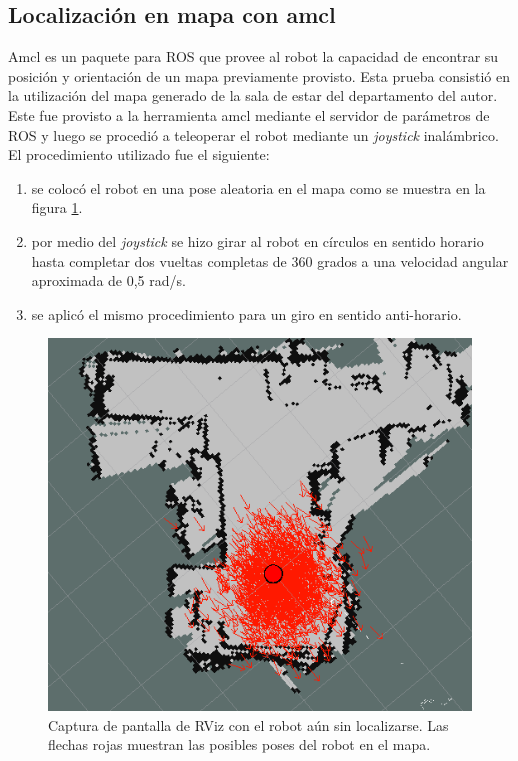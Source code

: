 \subsection{Localización en mapa con amcl}

Amcl es un paquete para ROS que provee al robot la capacidad de encontrar su posición y orientación de un mapa previamente provisto. Esta prueba consistió en la utilización del mapa generado de la sala de estar del departamento del autor. Este fue provisto a la herramienta amcl mediante el servidor de parámetros de ROS y luego se procedió a teleoperar el robot mediante un \textit{joystick} inalámbrico. El procedimiento utilizado fue el siguiente:

\begin{enumerate}
    \item se colocó el robot en una pose aleatoria en el mapa como se muestra en la figura \ref{fig:sinLocalizar}.
    \item por medio del \textit{joystick} se hizo girar al robot en círculos en sentido horario hasta completar dos vueltas completas de 360 grados a una velocidad angular aproximada de 0,5 rad/s.
    \item se aplicó el mismo procedimiento para un giro en sentido anti-horario.
\end{enumerate}


\begin{figure}[ht]
    \centering
    \includegraphics[scale=0.4]{./Figures/sin_localizar.png}
    \caption{Captura de pantalla de RViz con el robot aún sin localizarse. Las flechas rojas muestran las posibles poses del robot en el mapa.}
    \label{fig:sinLocalizar}
\end{figure}

